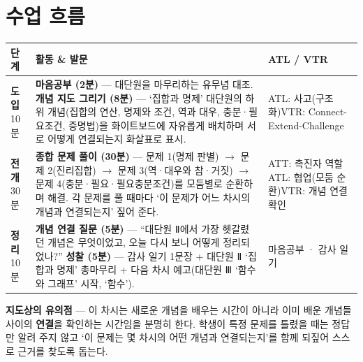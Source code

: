 \documentclass[11pt,a4paper]{article}
\begin{document}
\section{수업 흐름}
\begin{tabularx}{\linewidth}{@{}>{\centering\arraybackslash}p{1.6cm}X>{\raggedright\arraybackslash\small}p{3.1cm}@{}}
\toprule
\textbf{단계} & \textbf{활동 \& 발문} & \textbf{ATL / VTR} \\
\midrule
\textcolor{goldstrong}{\textbf{도입}}\newline\footnotesize 10분 &
\textbf{마음공부 (2분)} --- 대단원을 마무리하는 유무념 대조.\newline
\textbf{개념 지도 그리기 (8분)} --- `집합과 명제' 대단원의 하위 개념(집합의 연산, 명제와 조건, 역과 대우, 충분·필요조건, 증명법)을 화이트보드에 자유롭게 배치하며 서로 어떻게 연결되는지 화살표로 표시. &
ATL: 사고(구조화)\newline VTR: Connect-Extend-Challenge \\
\addlinespace
\textcolor{goldstrong}{\textbf{전개}}\newline\footnotesize 30분 &
\textbf{종합 문제 풀이 (30분)} --- 문제 1(명제 판별) $\to$ 문제 2(진리집합) $\to$ 문제 3(역·대우와 참·거짓) $\to$ 문제 4(충분·필요·필요충분조건)를 모둠별로 순환하며 해결. 각 문제를 풀 때마다 `이 문제가 어느 차시의 개념과 연결되는지' 짚어 준다. &
ATT: 촉진자 역할\newline ATL: 협업(모둠 순환)\newline VTR: 개념 연결 확인 \\
\addlinespace
\textcolor{goldstrong}{\textbf{정리}}\newline\footnotesize 10분 &
\textbf{개념 연결 질문 (5분)} --- ``대단원 Ⅱ에서 가장 헷갈렸던 개념은 무엇이었고, 오늘 다시 보니 어떻게 정리되었나?''\newline
\textbf{성찰 (5분)} --- 감사 일기 1문장 + 대단원 Ⅱ `집합과 명제' 총마무리 + 다음 차시 예고(대단원 Ⅲ `함수와 그래프' 시작, `함수'). &
마음공부 · 감사 일기 \\
\bottomrule
\end{tabularx}

\begin{calloutbox}
\textbf{지도상의 유의점} --- 이 차시는 새로운 개념을 배우는 시간이 아니라 이미 배운 개념들 사이의 \textbf{연결}을 확인하는 시간임을 분명히 한다. 학생이 특정 문제를 틀렸을 때는 정답만 알려 주지 않고 `이 문제는 몇 차시의 어떤 개념과 연결되는지'를 함께 되짚어 스스로 근거를 찾도록 돕는다.
\end{calloutbox}
\end{document}
